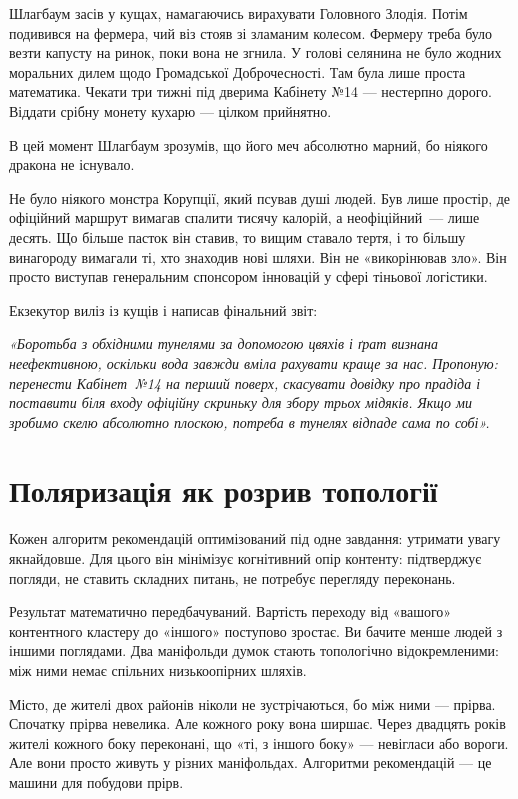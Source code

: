 \documentclass[12pt, a4paper, openany]{book}
\begin{document}
\begin{terrybox}
\medskip
Шлагбаум засів у кущах, намагаючись вирахувати Головного Злодія. Потім подивився на фермера, чий віз стояв зі зламаним колесом. Фермеру треба було везти капусту на ринок, поки вона не згнила. У голові селянина не було жодних моральних дилем щодо Громадської Доброчесності. Там була лише проста математика. Чекати три тижні під дверима Кабінету №14 — нестерпно дорого. Віддати срібну монету кухарю — цілком прийнятно.

В цей момент Шлагбаум зрозумів, що його меч абсолютно марний, бо ніякого дракона не існувало.

Не було ніякого монстра Корупції, який псував душі людей. Був лише простір, де офіційний маршрут вимагав спалити тисячу калорій, а неофіційний~--- лише десять. Що більше пасток він ставив, то вищим ставало тертя, і то більшу винагороду вимагали ті, хто знаходив нові шляхи. Він не «викорінював зло». Він просто виступав генеральним спонсором інновацій у сфері тіньової логістики.

Екзекутор виліз із кущів і написав фінальний звіт:

\medskip
\textit{«Боротьба з обхідними тунелями за допомогою цвяхів і ґрат визнана неефективною, оскільки вода завжди вміла рахувати краще за нас. Пропоную: перенести Кабінет~№14 на перший поверх, скасувати довідку про прадіда і поставити біля входу офіційну скриньку для збору трьох мідяків. Якщо ми зробимо скелю абсолютно плоскою, потреба в тунелях відпаде сама по собі».}
\end{terrybox}

\section{Поляризація як розрив топології}

Кожен алгоритм рекомендацій оптимізований під одне завдання: утримати увагу якнайдовше. Для цього він мінімізує когнітивний опір контенту: підтверджує погляди, не ставить складних питань, не потребує перегляду переконань.

Результат математично передбачуваний. Вартість переходу від «вашого» контентного кластеру до «іншого» поступово зростає. Ви бачите менше людей з іншими поглядами. Два маніфольди думок стають топологічно відокремленими: між ними немає спільних низькоопірних шляхів.

\begin{analogybox}
Місто, де жителі двох районів ніколи не зустрічаються, бо між ними --- прірва. Спочатку прірва невелика. Але кожного року вона ширшає. Через двадцять років жителі кожного боку переконані, що «ті, з іншого боку» --- невігласи або вороги. Але вони просто живуть у різних маніфольдах. Алгоритми рекомендацій --- це машини для побудови прірв.
\end{analogybox}
\end{document}
